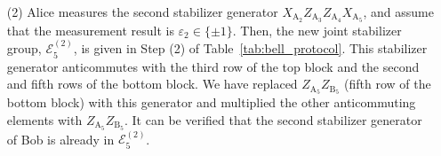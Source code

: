 \documentclass[journal,onecolumn]{IEEEtran}
\begin{document}
\begin{enumerate}
\item[(2)] Alice measures the second stabilizer generator $X_{\text{A}_2} Z_{\text{A}_3} Z_{\text{A}_4} X_{\text{A}_5}$, and %
assume that the measurement result is $\varepsilon_2 \in \{ \pm 1 \}$. %
Then, the new joint stabilizer group, $\mathcal{E}_5^{(2)}$, is given in Step (2) of Table~\ref{tab:bell_protocol}.
This stabilizer generator anticommutes with the third row of the top block and the second and fifth rows of the bottom block.
We have replaced $Z_{\text{A}_5} Z_{\text{B}_5}$ (fifth row of the bottom block) with this generator and multiplied the other anticommuting elements with $Z_{\text{A}_5} Z_{\text{B}_5}$.
It can be verified that the second stabilizer generator of Bob is already in $\mathcal{E}_5^{(2)}$. \\



\end{enumerate}
\end{document}
